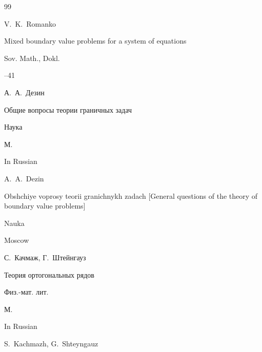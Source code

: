 \begin{thebibliography}{99}

\transl

\by V.~K.~Romanko

\paper Mixed boundary value problems for a system of equations

\jour Sov. Math., Dokl.




--41





\by А.~А.~Дезин

\book Общие вопросы теории граничных задач


\publ Наука

\publaddr М.




\misctransl

\lang In Russian

\by A.~A.~Dezin

\book Obshchiye voprosy teorii granichnykh zadach \rm [General questions of the theory of boundary value problems]


\publ Nauka

\publaddr Moscow







\by С.~Качмаж, Г.~Штейнгауз

\book Теория ортогональных рядов


\publ Физ.-мат. лит.

\publaddr М.



\misctransl

\lang In Russian

\by S.~Kachmazh, G.~Shteyngauz


\end{thebibliography}

